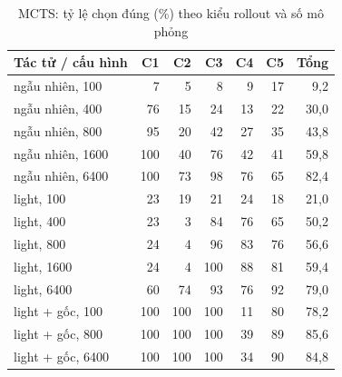 \begin{table}[H]
  \centering
  \footnotesize
  \caption{MCTS: tỷ lệ chọn đúng (\%) theo kiểu rollout và số mô phỏng}
  \label{tab:cs-ct-l4}
  \begin{tabular}{lrrrrrr}
    \toprule
    Tác tử / cấu hình & C1 & C2 & C3 & C4 & C5 & Tổng \\
    \midrule
    ngẫu nhiên, 100 & 7 & 5 & 8 & 9 & 17 & 9,2 \\
    ngẫu nhiên, 400 & 76 & 15 & 24 & 13 & 22 & 30,0 \\
    ngẫu nhiên, 800 & 95 & 20 & 42 & 27 & 35 & 43,8 \\
    ngẫu nhiên, 1600 & 100 & 40 & 76 & 42 & 41 & 59,8 \\
    ngẫu nhiên, 6400 & 100 & 73 & 98 & 76 & 65 & 82,4 \\
    \midrule
    light, 100 & 23 & 19 & 21 & 24 & 18 & 21,0 \\
    light, 400 & 23 & 3 & 84 & 76 & 65 & 50,2 \\
    light, 800 & 24 & 4 & 96 & 83 & 76 & 56,6 \\
    light, 1600 & 24 & 4 & 100 & 88 & 81 & 59,4 \\
    light, 6400 & 60 & 74 & 93 & 76 & 92 & 79,0 \\
    \midrule
    light + gốc, 100 & 100 & 100 & 100 & 11 & 80 & 78,2 \\
    light + gốc, 800 & 100 & 100 & 100 & 39 & 89 & 85,6 \\
    light + gốc, 6400 & 100 & 100 & 100 & 34 & 90 & 84,8 \\
    \bottomrule
  \end{tabular}
\end{table}
